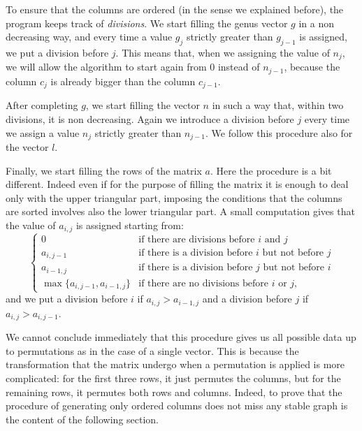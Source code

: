 \documentclass{amsart}
\theoremstyle{plain}
\theoremstyle{definition}
\begin{document}
To ensure that the columns are ordered (in the sense we explained
before), the program keeps track of \emph{divisions}. We start filling
the genus vector $g$ in a non decreasing way, and every time a value
$g_j$ strictly greater than $g_{j-1}$ is assigned, we put a division
before $j$.
This means that, when we assigning the value of $n_j$, we will allow
the algorithm to start again from $0$ instead of $n_{j-1}$, because the column
$c_j$ is already bigger than the column $c_{j-1}$.

After completing $g$, we start filling the vector $n$ in such a way
that, within two divisions, it is non decreasing. Again we introduce a
division before $j$ every time we assign a value $n_j$ strictly
greater than $n_{j-1}$. We follow this procedure also for the vector
$l$.

Finally, we start filling the rows of the matrix $a$. Here the
procedure is a bit different. Indeed even if for the purpose of filling
the matrix it is enough to deal only with the upper triangular part,
imposing the conditions that the columns are sorted involves also the
lower triangular part. A small computation gives that the value of
$a_{i,j}$ is assigned starting from:
\[
\begin{cases}
  0 & \text{if there are divisions before $i$ and $j$}\\
  a_{i,j-1} & \text{if there is a division before $i$ but not before
    $j$}\\
  a_{i-1,j} & \text{if there is a division before $j$ but not before
    $i$}\\
  \max\{a_{i,j-1}, a_{i-1,j}\} & \text{if there are no divisions
    before $i$ or $j$,}
\end{cases}
\]
and we put a division before $i$ if $a_{i,j} > a_{i-1,j}$ and a division
before $j$ if $a_{i,j} > a_{i,j-1}$.

We cannot conclude immediately that this procedure gives us all
possible data up to permutations as in the case of a single
vector. This is because the transformation that the matrix undergo
when a permutation is applied is more complicated: for the first three
rows, it just permutes the columns, but for the remaining rows, it
permutes both rows and columns. Indeed, to prove that the procedure of
generating only ordered columns does not miss any stable graph is the
content of the following section.
\end{document}

